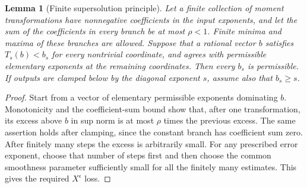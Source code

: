 \documentclass[11pt]{amsart}
\newtheorem{lemma}[theorem]{Lemma}
\theoremstyle{definition}
\numberwithin{equation}{section}
\begin{document}
\begin{lemma}[Finite supersolution principle]\label{lem:supersolution}
Let a finite collection of moment transformations have nonnegative
coefficients in the input exponents, and let the sum of the
coefficients in every branch be at most $\rho<1$. Finite minima
and maxima of these branches are allowed. Suppose that a rational
vector $b$ satisfies $T_s(b)<b_s$ for every nontrivial coordinate,
and agrees with permissible elementary exponents at the remaining
coordinates. Then every $b_s$ is permissible. If outputs are clamped
below by the diagonal exponent $s$, assume also that $b_s\ge s$.
\end{lemma}
\begin{proof}
Start from a vector of elementary permissible exponents dominating
$b$. Monotonicity and the coefficient-sum bound show that, after
one transformation, its excess above $b$ in sup norm is at most
$\rho$ times the previous excess. The same assertion holds after
clamping, since the constant branch has coefficient sum zero.
After finitely many steps the excess is arbitrarily small.
For any prescribed error exponent, choose that number of steps
first and then choose the common smoothness parameter sufficiently
small for all the finitely many estimates. This gives the required
$X^\epsilon$ loss.
\end{proof}
\end{document}
